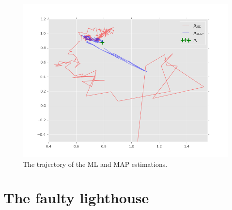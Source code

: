 \documentclass[paper=a4, fontsize=10pt]{scrartcl} %
\numberwithin{equation}{section} %
\numberwithin{figure}{section} %
\numberwithin{table}{section} %
\begin{document}
\begin{enumerate}
			\begin{figure}[H]
				\centering
				\includegraphics[scale=0.55]{trajectory.png}
				\caption{The trajectory of the ML and MAP estimations.}
				\label{traj}
			\end{figure}
\end{enumerate}

\section{The faulty lighthouse}
\end{document}
